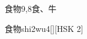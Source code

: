 \begin{entry}{食物}{9,8}{⾷、⽜}
  \begin{phonetics}{食物}{shi2wu4}[][HSK 2]
  \end{phonetics}
\end{entry}
